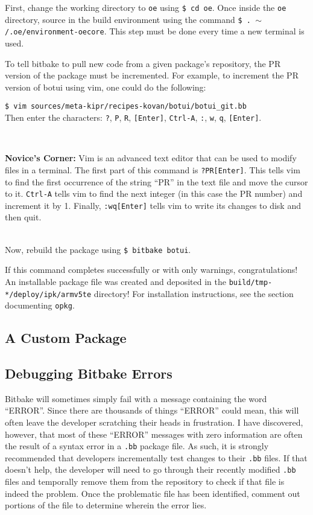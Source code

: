 \documentclass[12pt,letterpaper]{article}
\newcommand{\bcolorbox}[4]{\noindent \\ \fcolorbox{#1}{#2} {\parbox{\textwidth}{\vspace{.1em}\textbf{#3} #4\vspace{.1em}}} \\}
\newcommand{\novice}[1]{\bcolorbox{green}{Honeydew}{Novice's Corner:}{#1}}
\begin{document}
	First, change the working directory to \texttt{oe} using \texttt{\$ cd oe}. Once inside the \texttt{oe} directory, source in the build
	environment using the command \texttt{\$ . $\sim$/.oe/environment-oecore}. This step must be done every time a new terminal is used.
	
	To tell bitbake to pull new code from a given package's repository, the PR version of the package must be incremented. For example,
	to increment the PR version of botui using vim, one could do the following:
	
	\noindent \texttt{\$ vim sources/meta-kipr/recipes-kovan/botui/botui\_git.bb} \\
	\noindent Then enter the characters: \texttt{?}, \texttt{P}, \texttt{R}, \texttt{[Enter]}, \texttt{Ctrl-A}, \texttt{:}, \texttt{w}, \texttt{q}, \texttt{[Enter]}.
	
	\novice{Vim is an advanced text editor that can be used to modify files in a terminal. The first part of this command is \texttt{?PR[Enter]}.
	This tells vim to find the first occurrence of the string ``PR'' in the text file and move the cursor to it. \texttt{Ctrl-A} tells vim to
	find the next integer (in this case the PR number) and increment it by 1. Finally, \texttt{:wq[Enter]} tells vim to write its changes to disk
	and then quit.}
	
	Now, rebuild the package using \texttt{\$ bitbake botui}.
	
	If this command completes successfully or with only warnings, congratulations! An installable package file was created
	and deposited in the \texttt{build/tmp-*/deploy/ipk/armv5te} directory! For installation instructions, see the section
	documenting \texttt{opkg}.
	
	\subsection{A Custom Package}
	
	\subsection{Debugging Bitbake Errors}
	Bitbake will sometimes simply fail with a message containing the word ``ERROR''. Since there are thousands of things ``ERROR'' could
	mean, this will often leave the developer scratching their heads in frustration. I have discovered, however, that most of these ``ERROR''
	messages with zero information are often the result of a syntax error in a \texttt{.bb} package file. As such, it is strongly recommended
	that developers incrementally test changes to their \texttt{.bb} files. If that doesn't help, the developer will need to go through their
	recently modified \texttt{.bb} files and temporally remove them from the repository to check if that file is indeed the problem. Once the
	problematic file has been identified, comment out portions of the file to determine wherein the error lies.
	
\end{document}
